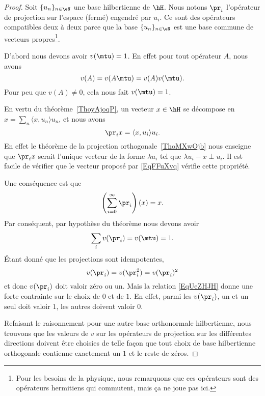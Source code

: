 \begin{proof}
    Soit \( \{ u_n \}_{n\in \eN}\) une base hilbertienne de \( \hH\). Nous notons \( \pr_i\) l'opérateur de projection sur l'espace (fermé) engendré par \( u_i\). Ce sont des opérateurs compatibles deux à deux parce que la base \( \{ u_n \}_{n\in \eN}\) est une base commune de vecteurs propres\footnote{Pour les besoins de la physique, nous remarquons que ces opérateurs sont des opérateurs hermitiens qui commutent, mais ça ne joue pas ici.}.

    D'abord nous devons avoir \( v(\mtu)=1\). En effet pour tout opérateur \( A\), nous avons
    \begin{equation}
        v(A)=v(A\mtu)=v(A)v(\mtu).
    \end{equation}
    Pour peu que \( v(A)\neq 0\), cela nous fait \( v(\mtu)=1\).

    En vertu du théorème~\ref{ThoyAjoqP}, un vecteur \( x\in\hH\) se décompose en \( x=\sum_n\langle x, u_n\rangle u_n\), et nous avons
    \begin{equation}    \label{EqFFuXvq}
        \pr_ix=\langle x, u_i\rangle u_i.
    \end{equation}
    En effet le théorème de la projection orthogonale~\ref{ThoMXwOjb} nous enseigne que \( \pr_ix\) serait l'unique vecteur de la forme \( \lambda u_i\) tel que \( \lambda u_i-x\perp u_i\). Il est facile de vérifier que le vecteur proposé par \eqref{EqFFuXvq} vérifie cette propriété.

    Une conséquence est que
    \begin{equation}
        \left( \sum_{i=0}^{\infty}\pr_i \right)(x)=x.
    \end{equation}
    Par conséquent, par hypothèse du théorème nous devons avoir
    \begin{equation}    \label{EqUeZHJH}
        \sum_iv(\pr_i)=v(\mtu)=1.
    \end{equation}
    Étant donné que les projections sont idempotentes,
    \begin{equation}
        v(\pr_i)=v(\pr_i^2)=v(\pr_i)^2
    \end{equation}
    et donc \( v(\pr_i)\) doit valoir zéro ou un. Mais la relation \eqref{EqUeZHJH} donne une forte contrainte sur le choix de \( 0\) et de \( 1\). En effet, parmi les \( v(\pr_i)\), un et un seul doit valoir \( 1\), les autres doivent valoir \( 0\).

    Refaisant le raisonnement pour une autre base orthonormale hilbertienne, nous trouvons que les valeurs de \( v\) sur les opérateurs de projection sur les différentes directions doivent être choisies de telle façon que tout choix de base hilbertienne orthogonale contienne exactement un \( 1\) et le reste de zéros.


\end{proof}
